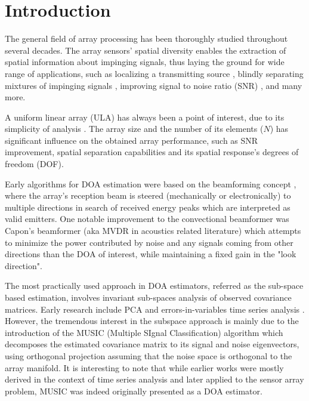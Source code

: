 \chapter{Introduction}
\label{chap:intro}
The general field of array processing has been thoroughly studied throughout several decades.
The array sensors' spatial diversity enables the extraction of spatial information about impinging signals, thus laying the ground for wide range of applications, such as localizing a transmitting source \cite{skolnik2008radar,long2019}, blindly separating mixtures of impinging signals \cite{comon1994independent}, improving signal to noise ratio (SNR) \cite{verdu1998multiuser}, and many more. 
\par A uniform linear array (ULA) has always been a point of interest, due to its simplicity of analysis \cite{van2004optimum,benesty2018}. 
The array size and the number of its elements ($N$) has significant influence on the obtained array performance, such as SNR improvement, spatial separation capabilities and its spatial response's degrees of freedom (DOF).
\par Early algorithms for DOA estimation were based on the beamforming concept \cite{krim1996two}, where the array's reception beam is steered (mechanically or electronically) to multiple directions in search of received energy peaks which are interpreted as valid emitters.
One notable improvement to the convectional beamformer \cite{van2004optimum} was Capon's beamformer  (aka MVDR in acoustics related literature) which attempts to minimize the power contributed by noise and any signals coming from other directions than the DOA of interest, while maintaining a fixed gain
in the "look direction".
\par The most practically used approach in DOA estimators, referred as the sub-space based estimation, involves invariant sub-spaces analysis of observed covariance matrices.
Early research include PCA and errors-in-variables time series analysis \cite{krim1996two}.   
However, the tremendous interest in the subspace approach is mainly due to the introduction of the
MUSIC (Multiple SIgnal Classification) algorithm \cite{schmidt1986multiple} which decomposes the estimated covariance matrix to its signal and noise eigenvectors, using orthogonal projection assuming that the noise space is orthogonal to the array manifold.
It is interesting to note that while earlier works were mostly derived in the context of time series analysis and later applied to the sensor array problem, MUSIC was indeed originally presented as a DOA estimator.
